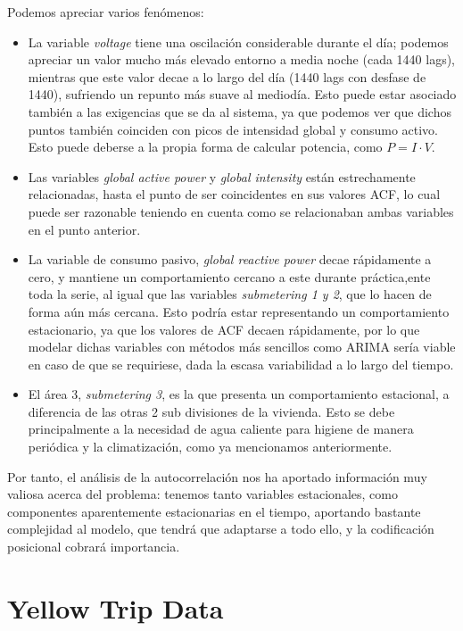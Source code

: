 Podemos apreciar varios fenómenos:
\begin{itemize}
	\item La variable \textit{voltage} tiene una oscilación considerable durante el día; podemos apreciar un valor mucho más elevado entorno a media noche (cada 1440 lags), mientras que este valor decae a lo largo del día (1440 lags con desfase de 1440), sufriendo un repunto más suave al mediodía. Esto puede estar asociado también a las exigencias que se da al sistema, ya que podemos ver que dichos puntos también coinciden con picos de intensidad global y consumo activo. Esto puede deberse a la propia forma de calcular potencia, como $P = I \cdot V$.
	\item Las variables \textit{global active power} y \textit{global intensity} están estrechamente relacionadas, hasta el punto de ser coincidentes en sus valores ACF, lo cual puede ser razonable teniendo en cuenta como se relacionaban ambas variables en el punto anterior.
	\item La variable de consumo pasivo, \textit{global reactive power} decae rápidamente a cero, y mantiene un comportamiento cercano a este durante práctica,ente toda la serie, al igual que las variables \textit{submetering 1 y 2}, que lo hacen de forma aún más cercana. Esto podría estar representando un comportamiento estacionario, ya que los valores de ACF decaen rápidamente, por lo que modelar dichas variables con métodos más sencillos como ARIMA sería viable en caso de que se requiriese, dada la escasa variabilidad a lo largo del tiempo. 
	\item El área 3, \textit{submetering 3}, es la que presenta un comportamiento estacional, a diferencia de las otras 2 sub divisiones de la vivienda. Esto se debe principalmente a la necesidad de agua caliente para higiene de manera periódica y la climatización, como ya mencionamos anteriormente.
\end{itemize}

Por tanto, el análisis de la autocorrelación nos ha aportado información muy valiosa acerca del problema: tenemos tanto variables estacionales, como componentes aparentemente estacionarias en el tiempo, aportando bastante complejidad al modelo, que tendrá que adaptarse a todo ello, y la codificación posicional cobrará importancia.

\section{Yellow Trip Data}

